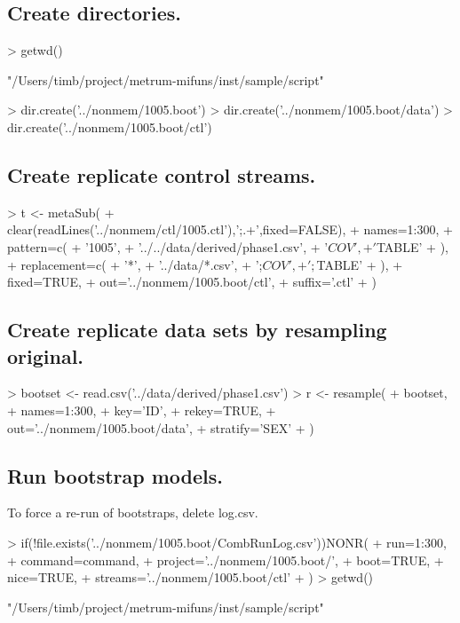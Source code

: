 \subsection{Create directories.}
\begin{Schunk}
\begin{Sinput}
> getwd()
\end{Sinput}
\begin{Soutput}
[1] "/Users/timb/project/metrum-mifuns/inst/sample/script"
\end{Soutput}
\begin{Sinput}
> dir.create('../nonmem/1005.boot')
> dir.create('../nonmem/1005.boot/data')
> dir.create('../nonmem/1005.boot/ctl')
\end{Sinput}
\end{Schunk}
\subsection{Create replicate control streams.}
\begin{Schunk}
\begin{Sinput}
> t <- metaSub(
+      clear(readLines('../nonmem/ctl/1005.ctl'),';.+',fixed=FALSE),
+      names=1:300,
+      pattern=c(
+          '1005',
+          '../../data/derived/phase1.csv',
+          '$COV',
+          '$TABLE'
+      ),
+      replacement=c(
+          '*',
+          '../data/*.csv',
+          ';$COV',
+          ';$TABLE'
+     ),
+     fixed=TRUE,
+     out='../nonmem/1005.boot/ctl',
+     suffix='.ctl'
+  )
\end{Sinput}
\end{Schunk}
\subsection{Create replicate data sets by resampling original.}
\begin{Schunk}
\begin{Sinput}
>  bootset <- read.csv('../data/derived/phase1.csv')
>  r <- resample(
+  	bootset,
+  	names=1:300,
+  	key='ID',
+  	rekey=TRUE,
+  	out='../nonmem/1005.boot/data',
+  	stratify='SEX'
+  )
\end{Sinput}
\end{Schunk}
\subsection{Run bootstrap models.}
To force a re-run of bootstraps, delete log.csv.
\begin{Schunk}
\begin{Sinput}
> if(!file.exists('../nonmem/1005.boot/CombRunLog.csv'))NONR(
+      run=1:300,
+      command=command,
+      project='../nonmem/1005.boot/',
+      boot=TRUE,
+      nice=TRUE,
+      streams='../nonmem/1005.boot/ctl'
+ )
> getwd()  
\end{Sinput}
\begin{Soutput}
[1] "/Users/timb/project/metrum-mifuns/inst/sample/script"
\end{Soutput}
\end{Schunk}
